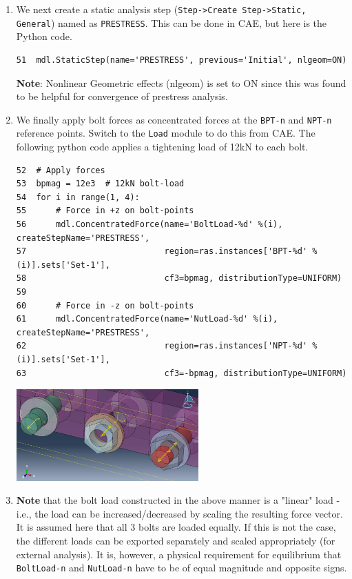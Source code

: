 \documentclass[11pt]{article}
\begin{document}
\begin{enumerate}
\begin{center}
\end{center}
\item We next create a static analysis step (\texttt{Step->Create Step->Static, General}) named as \texttt{PRESTRESS}.
This can be done in CAE, but here is the Python code.
\begin{verbatim}
51  mdl.StaticStep(name='PRESTRESS', previous='Initial', nlgeom=ON)
\end{verbatim}
\textbf{Note}: Nonlinear Geometric effects (nlgeom) is set to ON since this was found to be helpful for convergence of prestress analysis.
\item We finally apply bolt forces as concentrated forces at the \texttt{BPT-n} and \texttt{NPT-n} reference points.
Switch to the \texttt{Load} module to do this from CAE.
The following python code applies a tightening load of 12kN to each bolt.
\begin{verbatim}
52  # Apply forces
53  bpmag = 12e3  # 12kN bolt-load
54  for i in range(1, 4):
55      # Force in +z on bolt-points
56      mdl.ConcentratedForce(name='BoltLoad-%d' %(i), createStepName='PRESTRESS',
57                            region=ras.instances['BPT-%d' %(i)].sets['Set-1'],
58                            cf3=bpmag, distributionType=UNIFORM)
59  
60      # Force in -z on bolt-points
61      mdl.ConcentratedForce(name='NutLoad-%d' %(i), createStepName='PRESTRESS',
62                            region=ras.instances['NPT-%d' %(i)].sets['Set-1'],
63                            cf3=-bpmag, distributionType=UNIFORM)
\end{verbatim}
\begin{center}
\includegraphics[width=0.55\textwidth]{./figs/loads.png}
\end{center}
\item \textbf{Note} that the bolt load constructed in the above manner is a "linear" load - i.e., the load can be increased/decreased by scaling the resulting force vector.
It is assumed here that all 3 bolts are loaded equally.
If this is not the case, the different loads can be exported separately and scaled appropriately (for external analysis).
It is, however, a physical requirement for equilibrium that \texttt{BoltLoad-n} and \texttt{NutLoad-n} have to be of equal magnitude and opposite signs.
\end{enumerate}
\end{document}
